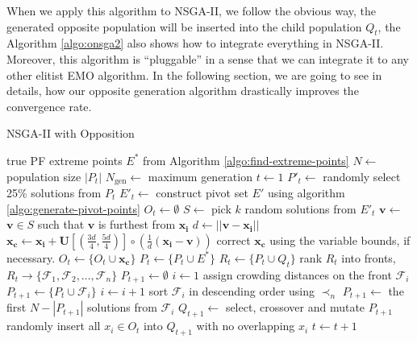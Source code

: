 \documentclass[journal]{IEEEtran}
\let\MYoriglatexcaption\caption
\renewcommand{\caption}[2][\relax]{\MYoriglatexcaption[#2]{#2}}
\begin{document}
When we apply this algorithm to NSGA-II, we follow the obvious way, the generated opposite population will be inserted into the child population \(Q_t\), the Algorithm \ref{algo:onsga2} also shows how to integrate everything in NSGA-II. Moreover, this algorithm is ``pluggable'' in a sense that we can integrate it to any other elitist EMO algorithm. In the following section, we are going to see in details, how our opposite generation algorithm drastically improves the convergence rate.
%
\begin{algorithm}[tp]
\caption{NSGA-II with Opposition}
\label{algo:onsga2}
\begin{algorithmic}[1]
	\REQUIRE true PF extreme points $E^{\ast}$ from Algorithm \ref{algo:find-extreme-points}
	\STATE $N \leftarrow$ population size $|P_t|$
	\STATE $N_{\text{gen}} \leftarrow $ maximum generation
	\STATE $t \leftarrow 1$
		\STATE $P'_t \leftarrow$ randomly select 25\% solutions from $P_t$
		\STATE $E'_t \leftarrow$ construct pivot set $E'$ using algorithm \ref{algo:generate-pivot-points}
		\STATE $O_t \leftarrow \emptyset$
			\STATE $S \leftarrow$ pick $k$ random solutions from $E'_t$
			\STATE $\mathbf{v} \leftarrow$ $\mathbf{v} \in S$ such that $\mathbf{v}$ is furthest from $\mathbf{x_i}$
			\STATE $d \leftarrow ||\mathbf{v} - \mathbf{x_i}||$
			\STATE $\mathbf{x_c} \leftarrow \mathbf{x_i} + \mathbf{U}[(\frac{3d}{4}, \frac{5d}{4})] \circ (\frac{1}{d}(\mathbf{x_i} - \mathbf{v}))$
			\STATE correct $\mathbf{x_c}$ using the variable bounds, if necessary.
			\STATE $O_t \leftarrow \{O_t \cup \mathbf{x_c}\}$
		\ENDFOR
		\STATE $P_t \leftarrow \{P_t \cup  E^\ast\}$
		\STATE $R_t \leftarrow \{P_t \cup Q_t\}$
		\STATE rank $R_t$ into fronts, $R_t \rightarrow \{\mathcal{F}_1, \mathcal{F}_2, \ldots, \mathcal{F}_n\}$
		\STATE $P_{t+1} \leftarrow \emptyset$
		\STATE $i \leftarrow 1$
			\STATE assign crowding distances on the front $\mathcal{F}_i$
			\STATE $P_{t+1} \leftarrow \{P_t \cup \mathcal{F}_i\}$
			\STATE $i \leftarrow i + 1$
		\ENDWHILE
		\STATE sort $\mathcal{F}_i$ in descending order using $\prec_n$
		\STATE $P_{t+1} \leftarrow$ the first $N - |P_{t+1}|$ solutions from $\mathcal{F}_i$
		\STATE $Q_{t+1} \leftarrow$ select, crossover and mutate $P_{t+1}$
		\STATE randomly insert all $x_i \in O_t$ into $Q_{t+1}$ with no overlapping $x_i$
		\STATE $t \leftarrow t + 1$
	\ENDWHILE
\end{algorithmic}
\end{algorithm}
\end{document}
